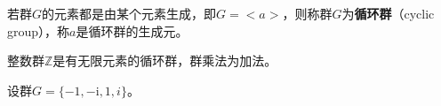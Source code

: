 
\begin{definition}{}
若群$G$的元素都是由某个元素生成，即$G=<a>$，则称群$G$为\textbf{循环群}（cyclic group），称$a$是循环群的生成元。
\end{definition}
\begin{example}{}
整数群$\mathbb Z$是有无限元素的循环群，群乘法为加法。
\end{example}
\begin{example}{}

\end{example}
\begin{example}{}
设群$G=\{-1,-\mathrm i,1,i\}$。
\end{example}